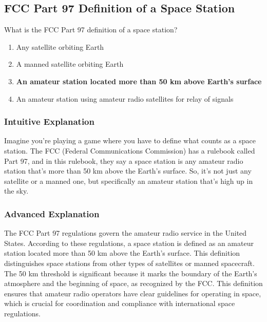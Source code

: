 \subsection{FCC Part 97 Definition of a Space Station}
\label{T1A07}

\begin{tcolorbox}[colback=gray!10!white,colframe=black!75!black,title=T1A07]
What is the FCC Part 97 definition of a space station?
\begin{enumerate}[label=\Alph*),noitemsep]
    \item Any satellite orbiting Earth
    \item A manned satellite orbiting Earth
    \item \textbf{An amateur station located more than 50 km above Earth's surface}
    \item An amateur station using amateur radio satellites for relay of signals
\end{enumerate}
\end{tcolorbox}

\subsubsection*{Intuitive Explanation}
Imagine you're playing a game where you have to define what counts as a space station. The FCC (Federal Communications Commission) has a rulebook called Part 97, and in this rulebook, they say a space station is any amateur radio station that's more than 50 km above the Earth's surface. So, it's not just any satellite or a manned one, but specifically an amateur station that's high up in the sky.

\subsubsection*{Advanced Explanation}
The FCC Part 97 regulations govern the amateur radio service in the United States. According to these regulations, a space station is defined as an amateur station located more than 50 km above the Earth's surface. This definition distinguishes space stations from other types of satellites or manned spacecraft. The 50 km threshold is significant because it marks the boundary of the Earth's atmosphere and the beginning of space, as recognized by the FCC. This definition ensures that amateur radio operators have clear guidelines for operating in space, which is crucial for coordination and compliance with international space regulations.